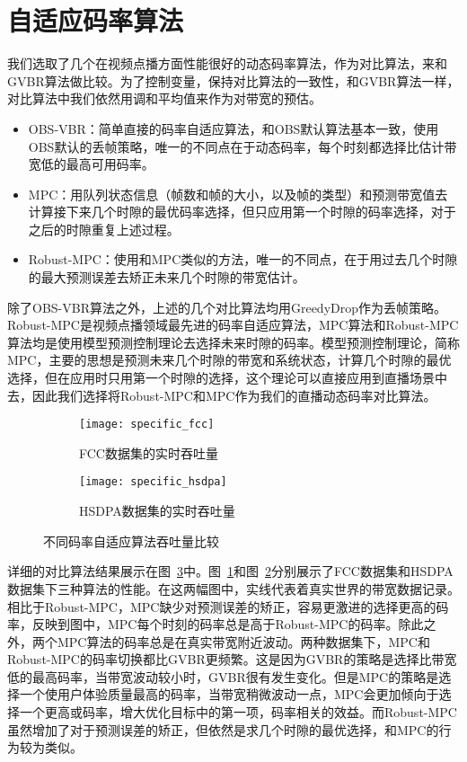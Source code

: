 \section{自适应码率算法}
我们选取了几个在视频点播方面性能很好的动态码率算法，作为对比算法，来和GVBR算法做比较。为了控制变量，保持对比算法的一致性，和GVBR算法一样，对比算法中我们依然用调和平均值来作为对带宽的预估。
\begin{itemize}
  \item OBS-VBR：简单直接的码率自适应算法，和OBS默认算法基本一致，使用OBS默认的丢帧策略，唯一的不同点在于动态码率，每个时刻都选择比估计带宽低的最高可用码率。
  \item MPC：用队列状态信息（帧数和帧的大小，以及帧的类型）和预测带宽值去计算接下来几个时隙的最优码率选择，但只应用第一个时隙的码率选择，对于之后的时隙重复上述过程。
  \item Robust-MPC：使用和MPC类似的方法，唯一的不同点，在于用过去几个时隙的最大预测误差去矫正未来几个时隙的带宽估计。
\end{itemize}
除了OBS-VBR算法之外，上述的几个对比算法均用GreedyDrop作为丢帧策略。Robust-MPC是视频点播领域最先进的码率自适应算法，MPC算法和Robust-MPC算法均是使用模型预测控制理论去选择未来时隙的码率。模型预测控制理论，简称MPC，主要的思想是预测未来几个时隙的带宽和系统状态，计算几个时隙的最优选择，但在应用时只用第一个时隙的选择，这个理论可以直接应用到直播场景中去，因此我们选择将Robust-MPC和MPC作为我们的直播动态码率对比算法。

\begin{figure}[tb]
  \centering%
  \begin{subfigure}{0.5\textwidth}
    \texttt{[image: specific\_fcc]}
    \caption{FCC数据集的实时吞吐量}
    \label{fig:fcc}
  \end{subfigure}%
  \hfill
  \begin{subfigure}{0.5\textwidth}
    \texttt{[image: specific\_hsdpa]}
    \caption{HSDPA数据集的实时吞吐量}
    \label{fig:hsdpa}
  \end{subfigure}
  \caption{不同码率自适应算法吞吐量比较}
  \label{fig:specific}
\end{figure}

详细的对比算法结果展示在图~\ref{fig:specific}中。图~\ref{fig:fcc}和图~\ref{fig:hsdpa}分别展示了FCC数据集和HSDPA数据集下三种算法的性能。在这两幅图中，实线代表着真实世界的带宽数据记录。相比于Robust-MPC，MPC缺少对预测误差的矫正，容易更激进的选择更高的码率，反映到图中，MPC每个时刻的码率总是高于Robust-MPC的码率。除此之外，两个MPC算法的码率总是在真实带宽附近波动。两种数据集下，MPC和Robust-MPC的码率切换都比GVBR更频繁。这是因为GVBR的策略是选择比带宽低的最高码率，当带宽波动较小时，GVBR很有发生变化。但是MPC的策略是选择一个使用户体验质量最高的码率，当带宽稍微波动一点，MPC会更加倾向于选择一个更高或码率，增大优化目标中的第一项，码率相关的效益。而Robust-MPC虽然增加了对于预测误差的矫正，但依然是求几个时隙的最优选择，和MPC的行为较为类似。

